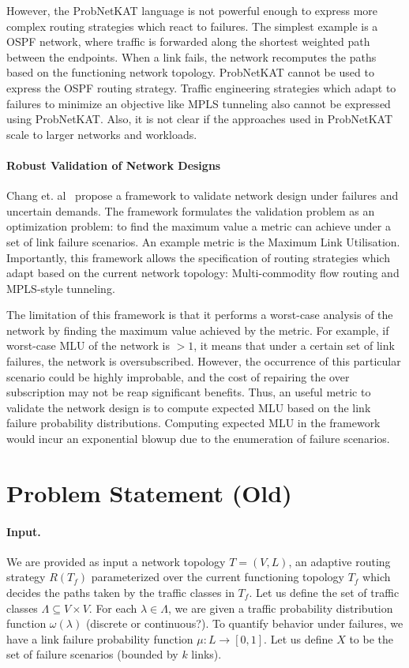 \documentclass[]{article}
\begin{document}
However, the ProbNetKAT language is not powerful enough to 
express more complex routing strategies which react to failures. 
The simplest example is a OSPF network, where traffic is 
forwarded along the shortest weighted path between the endpoints. 
When a link fails, the network recomputes the paths based on the 
functioning network topology. ProbNetKAT cannot be used to express
the OSPF routing strategy. Traffic engineering strategies which adapt 
to failures to minimize an objective like MPLS tunneling also 
cannot be expressed using ProbNetKAT. Also, it is not clear 
if the approaches used in ProbNetKAT scale to larger networks 
and workloads.

\paragraph{Robust Validation of Network Designs}
Chang et. al~\cite{robustvalidation} propose a framework 
to validate network design under failures and uncertain demands. 
The framework formulates the validation problem as an 
optimization problem: to find the maximum value a metric can
achieve under a set of link failure scenarios. An example 
metric is the Maximum Link Utilisation. Importantly,
this framework allows the specification of routing strategies
which adapt based on the current network topology: Multi-commodity
flow routing and MPLS-style tunneling. 

The limitation of this framework is that it performs a 
worst-case analysis of the network by finding the maximum value 
achieved by the metric. For example, if worst-case 
MLU of the network is $> 1$,
it means that under a certain set of link failures, the network is
oversubscribed. However, the occurrence of this particular scenario
could be highly improbable, and the cost of repairing the 
over subscription may not be reap significant benefits. 
Thus, an useful metric
to validate the network design is to 
compute expected MLU based on the 
link failure probability distributions. 
Computing expected 
MLU in the framework 
would incur an exponential blowup due to the
enumeration of failure scenarios.

\section{Problem Statement (Old)}
\paragraph{Input.} We are provided as input a 
network topology $T=(V,L)$, an adaptive 
routing strategy $R(T_f)$
parameterized over the current functioning topology $T_f$
which decides the paths taken by the traffic classes
in $T_f$. Let us define the 
set of traffic classes $\Lambda 
\subseteq V \times V$. For each $\lambda \in \Lambda$,
we are given a traffic probability 
distribution function 
$\omega(\lambda)$
(discrete or continuous?). To quantify behavior under
failures, we have a link failure probability function
$\mu: L \rightarrow [0,1]$. Let us define $X$ to be 
the set of failure scenarios (bounded by $k$ links).
\end{document}
